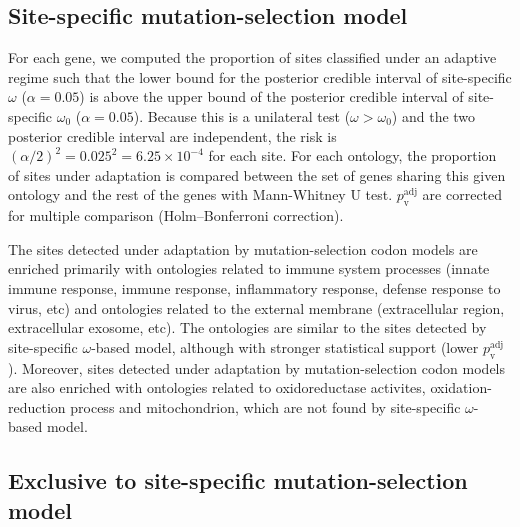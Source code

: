 \documentclass{article}
\begin{document}
    \subsection{Site-specific mutation-selection model}
    \label{subsec:mutation-selection-codon-method}

    For each gene, we computed the proportion of sites classified under an adaptive regime such that the lower bound for the posterior credible interval of site-specific $\omega$ ($\alpha=0.05$) is above the upper bound of the posterior credible interval of site-specific $\omega_{0}$ ($\alpha=0.05$).
    Because this is a unilateral test ($\omega > \omega_{0}$) and the two posterior credible interval are independent, the risk is $(\alpha/2)^2=0.025^2=6.25 \times 10^{-4}$ for each site.
    For each ontology, the proportion of sites under adaptation is compared between the set of genes sharing this given ontology and the rest of the genes with Mann-Whitney U test.
    $p_{\mathrm{v}}^{\mathrm{adj}}$ are corrected for multiple comparison (Holm–Bonferroni correction).

    \begin{center}
        \footnotesize
        
    \end{center}
    The sites detected under adaptation by mutation-selection codon models are enriched primarily with ontologies related to immune system processes (innate immune response, immune response, inflammatory response, defense response to virus, etc) and ontologies related to the external membrane (extracellular region, extracellular exosome, etc).
    The ontologies are similar to the sites detected by site-specific $\omega$-based model, although with stronger statistical support (lower $p_{\mathrm{v}}^{\mathrm{adj}}$).
    Moreover, sites detected under adaptation by mutation-selection codon models are also enriched with ontologies related to oxidoreductase activites, oxidation-reduction process and mitochondrion, which are not found by site-specific $\omega$-based model.

    \subsection{Exclusive to site-specific mutation-selection model}
    \label{subsec:exclusive-to-mutation-selection-codon-method}
\end{document}
